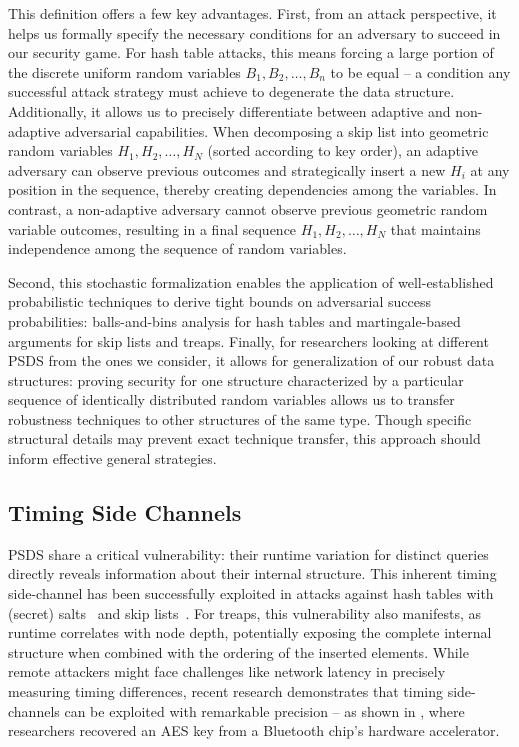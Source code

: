 This definition offers a few key advantages. First, from an attack perspective, it helps us formally specify the necessary conditions for an adversary to succeed in our security game. For hash table attacks, this means forcing a large portion of the discrete uniform random variables $B_1, B_2, \ldots, B_n$ to be equal -- a condition any successful attack strategy must achieve to degenerate the data structure. Additionally, it allows us to precisely differentiate between adaptive and non-adaptive adversarial capabilities. When decomposing a skip list into geometric random variables $H_1, H_2, \ldots, H_N$ (sorted according to key order), an adaptive adversary can observe previous outcomes and strategically insert a new $H_i$ at any position in the sequence, thereby creating dependencies among the variables. In contrast, a non-adaptive adversary cannot observe previous geometric random variable outcomes, resulting in a final sequence $H_1, H_2, \ldots, H_N$ that maintains independence among the sequence of random variables. 

Second, this stochastic formalization enables the application of well-established probabilistic techniques to derive tight bounds on adversarial success probabilities: balls-and-bins analysis for hash tables and martingale-based arguments for skip lists and treaps. Finally, for researchers looking at different PSDS from the ones we consider, it allows for generalization of our robust data structures: proving security for one structure characterized by a particular sequence of identically distributed random variables allows us to transfer robustness techniques to other structures of the same type. Though specific structural details may prevent exact technique transfer, this approach should inform effective general strategies.

\subsection{Timing Side Channels}
\label{sec:side}

PSDS share a critical vulnerability: their runtime variation for distinct queries directly reveals information about their internal structure. This inherent timing side-channel has been successfully exploited in attacks against hash tables with (secret) salts~\cite{bar2007remote} and skip lists~\cite{nussbaum2019skiplist}. For treaps, this vulnerability also manifests, as runtime correlates with node depth, potentially exposing the complete internal structure when combined with the ordering of the inserted elements. While remote attackers might face challenges like network latency in precisely measuring timing differences, recent research demonstrates that timing side-channels can be exploited with remarkable precision -- as shown in \cite{ji2025your}, where researchers recovered an AES key from a Bluetooth chip's hardware accelerator.


